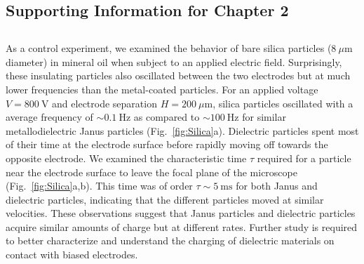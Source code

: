 \begin{appendices}



\chapter{Supporting Information for Chapter 2}



\section{}


\subsection{} \label{sec:Dielectric}

As a control experiment, we examined the behavior of bare silica particles ($8~\mu\text{m}$ diameter) in mineral oil when subject to an applied electric field.
Surprisingly, these insulating particles also oscillated between the two electrodes but at much lower frequencies than the metal-coated particles.
For an applied voltage $V=800~\text{V}$ and electrode separation $H=200~\mu\text{m}$, silica particles oscillated with a average frequency of ${\sim}0.1~\text{Hz}$ as compared to ${\sim}100~\text{Hz}$ for similar metallodielectric Janus particles (Fig.~\ref{fig:Silica}a). 
Dielectric particles spent most of their time at the electrode surface before rapidly moving off towards the opposite electrode.
We examined the characteristic time $\tau$ required for a particle near the electrode surface to leave the focal plane of the microscope (Fig.~\ref{fig:Silica}a,b).
This time was of order $\tau\sim 5~\text{ms}$ for both Janus and dielectric particles, indicating that the different particles moved at similar velocities.
These observations suggest that Janus particles and dielectric particles acquire similar amounts of charge but at different rates.
Further study is required to better characterize and understand the charging of dielectric materials on contact with biased electrodes.


\end{appendices}
